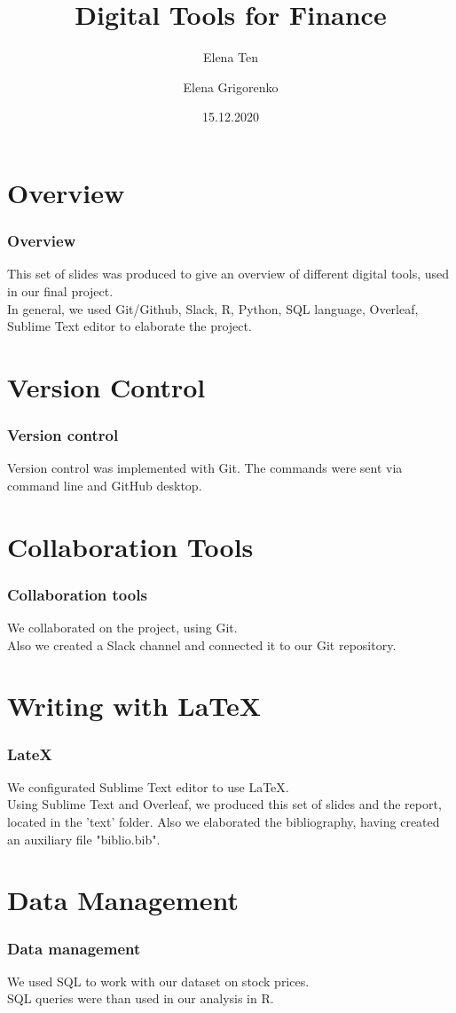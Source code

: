 \documentclass {beamer}
\title{Digital Tools for Finance}
\author [Ten, Grigorenko] {Elena Ten \and Elena Grigorenko}
\institute [UZH] {University of Zurich}
\date {15.12.2020}
\begin{document}
\frame{\titlepage}

\section{Overview}
\begin{frame}
\frametitle{Overview}
This set of slides was produced to give an overview of different digital tools, used in our final project.\\
In general, we used Git/Github, Slack, R, Python, SQL language, Overleaf, Sublime Text editor to elaborate the project. 

\end{frame}



\section{Version Control}
\begin{frame}
\frametitle{Version control}
Version control was implemented with Git. The commands were sent via command line and GitHub desktop.

\end{frame}


\section{Collaboration Tools}
\begin{frame}
\frametitle{Collaboration tools}
We collaborated on the project, using Git.\\
Also we created a Slack channel and connected it to our Git repository.

\end{frame}


\section{Writing with LaTeX}
\begin{frame}
\frametitle{LateX}
We configurated Sublime Text editor to use LaTeX.\\
Using Sublime Text and Overleaf, we produced this set of slides and the report, located in the 'text' folder.
Also we elaborated the bibliography, having created an auxiliary file "biblio.bib".


\end{frame}

\section{Data Management}
\begin{frame}
\frametitle{Data management}
We used SQL to work with our dataset on stock prices.\\
SQL queries were than used in our analysis in R.

\end{frame}
\end{document}
